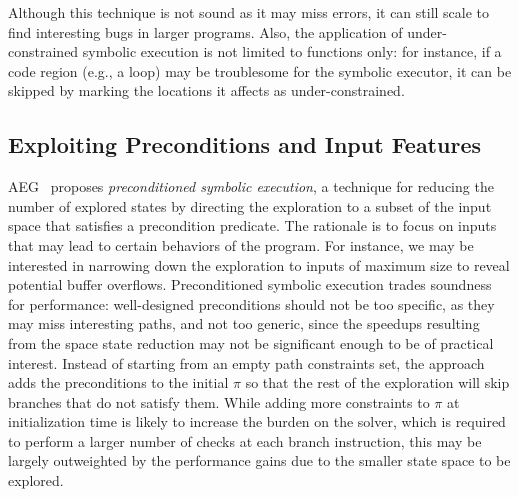 Although this technique is not sound as it may miss errors, it can still scale to find interesting bugs in larger programs. Also, the application of under-constrained symbolic execution is not limited to functions only: for instance, if a code region (e.g., a loop) may be troublesome for the symbolic executor, it can be skipped by marking the locations it affects as under-constrained. 

\subsection{Exploiting Preconditions and Input Features}%
\label{precontioned-symbolic-execution}

 {\sc AEG}~\cite{AEG-NDSS11} proposes {\em preconditioned symbolic execution}, a technique for reducing the number of explored states by directing the exploration to a subset of the input space that satisfies a precondition predicate. The rationale is to focus on inputs that may lead to certain behaviors of the program.
For instance, we may be interested in narrowing down the exploration to inputs of maximum size to reveal potential buffer overflows. Preconditioned symbolic execution trades soundness for performance: well-designed preconditions should not be too specific, as they may miss interesting paths, and not too generic, since the speedups resulting from the space state reduction may not be significant enough to be of practical interest. Instead of starting from an empty path constraints set, the approach adds the preconditions to the initial $\pi$ so that the rest of the exploration will skip branches that do not satisfy them. While adding more constraints to $\pi$ at initialization time is likely to increase the burden on the solver, which is required to perform a larger number of checks at each branch instruction, this may be largely outweighted by the performance gains due to the smaller state space to be explored.


